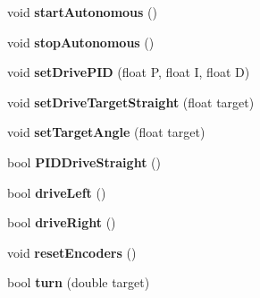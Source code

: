 \begin{DoxyCompactItemize}
\item 
\hypertarget{classTKOAutonomous_afe6c83e31ebbd3adc4f47d8894553ab0}{void {\bfseries start\-Autonomous} ()}\label{classTKOAutonomous_afe6c83e31ebbd3adc4f47d8894553ab0}

\item 
\hypertarget{classTKOAutonomous_a252382a5492ea8412a6e5ddd3f0d9318}{void {\bfseries stop\-Autonomous} ()}\label{classTKOAutonomous_a252382a5492ea8412a6e5ddd3f0d9318}

\item 
\hypertarget{classTKOAutonomous_aa6a2879faa04015da8853e852a620f21}{void {\bfseries set\-Drive\-P\-I\-D} (float \-P, float \-I, float \-D)}\label{classTKOAutonomous_aa6a2879faa04015da8853e852a620f21}

\item 
\hypertarget{classTKOAutonomous_a2a2f8605d3413c682453d2739b776805}{void {\bfseries set\-Drive\-Target\-Straight} (float target)}\label{classTKOAutonomous_a2a2f8605d3413c682453d2739b776805}

\item 
\hypertarget{classTKOAutonomous_af3808e8da193b79f8f54d85ecc51c64a}{void {\bfseries set\-Target\-Angle} (float target)}\label{classTKOAutonomous_af3808e8da193b79f8f54d85ecc51c64a}

\item 
\hypertarget{classTKOAutonomous_afc5c780417cfbd80893386e88069eac2}{bool {\bfseries \-P\-I\-D\-Drive\-Straight} ()}\label{classTKOAutonomous_afc5c780417cfbd80893386e88069eac2}

\item 
\hypertarget{classTKOAutonomous_ac0c57dbb30828daabf60f386e7d021ff}{bool {\bfseries drive\-Left} ()}\label{classTKOAutonomous_ac0c57dbb30828daabf60f386e7d021ff}

\item 
\hypertarget{classTKOAutonomous_ae5c957b1abf7e238638779e2bcb4b6f7}{bool {\bfseries drive\-Right} ()}\label{classTKOAutonomous_ae5c957b1abf7e238638779e2bcb4b6f7}

\item 
\hypertarget{classTKOAutonomous_a66dea0801ab06848b3adb4546e25e989}{void {\bfseries reset\-Encoders} ()}\label{classTKOAutonomous_a66dea0801ab06848b3adb4546e25e989}

\item 
\hypertarget{classTKOAutonomous_ad3b4a6a372007341264cff3ae8e02914}{bool {\bfseries turn} (double target)}\label{classTKOAutonomous_ad3b4a6a372007341264cff3ae8e02914}


\end{DoxyCompactItemize}

